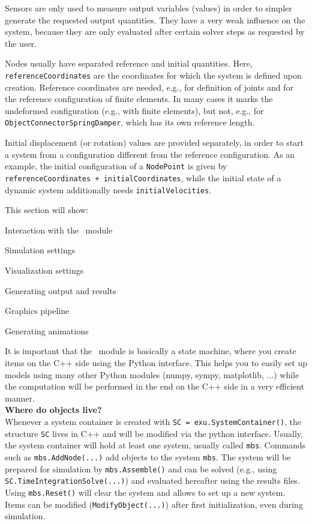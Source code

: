 Sensors are only used to measure output variables (values) in order to simpler generate the requested output quantities.
They have a very weak influence on the system, because they are only evaluated after certain solver steps as requested by the user.

Nodes usually have separated reference and initial quantities. Here, 
\texttt{referenceCoordinates} are the coordinates for which the system is defined upon creation. Reference coordinates are needed, e.g., for definition of joints and for the reference configuration of finite elements. In many cases it marks the undeformed configuration (e.g., with finite elements), but not, e.g., for \texttt{ObjectConnectorSpringDamper}, which has its own reference length. 

Initial displacement (or rotation) values are provided separately, in order to start a system from a configuration different from the reference configuration.
As an example, the initial configuration of a \texttt{NodePoint} is given by \texttt{referenceCoordinates + initialCoordinates}, while the initial state of a dynamic system additionally needs \texttt{initialVelocities}.


 \label{sec_exudynBasics}
This section will show:
\bi
	\item Interaction with the \codeName\ module
	\item Simulation settings
	\item Visualization settings
	\item Generating output and results
	\item Graphics pipeline
	\item Generating animations
\ei


It is important that the \codeName\ module is basically a state machine, where you create items on the C++ side using the Python interface. This helps you to easily set up models using many other Python modules (numpy, sympy, matplotlib, ...) while the computation will be performed in the end on the C++ side in a very efficient manner. 
\vspace{12pt}\\
{\bf Where do objects live?}\vspace{6pt}\\
Whenever a system container is created with \texttt{SC = exu.SystemContainer()}, the structure \texttt{SC} lives in C++ and will be modified via the python interface.
Usually, the system container will hold at least one system, usually called \texttt{mbs}.
Commands such as \texttt{mbs.AddNode(...)} add objects to the system \texttt{mbs}. 
The system will be prepared for simulation by \texttt{mbs.Assemble()} and can be solved (e.g., using \texttt{SC.TimeIntegrationSolve(...)}) and evaluated hereafter using the results files.
Using \texttt{mbs.Reset()} will clear the system and allows to set up a new system. Items can be modified (\texttt{ModifyObject(...)}) after first initialization, even during simulation.
%

